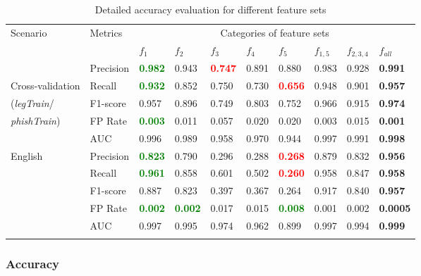 \documentclass[10pt,conference,compsocconf,letterpaper]{IEEEtran}
\begin{document}
\iffeateval
\begin{table*}[th]
\caption{Detailed accuracy evaluation for different feature sets} \centering
	\begin{tabular}{ p{2.3cm} p{2.2cm}  p{1.1cm}  p{1.1cm}  p{1.1cm} p{1.1cm}   p{1.1cm}   p{1.1cm}   p{1.1cm}   p{1.1cm}   }
	Scenario	& Metrics & \multicolumn{8}{c}{Categories of feature sets} \\
 &  &   $f_1$ & $f_2$ & $f_3$  & $f_4$ & $f_5$ & $f_{1,5}$  & $f_{2,3,4}$ &\textbf{$f_{all}$}  \\
		\hline
 &	Precision & \textbf{\textcolor{green}{0.982}} & 0.943 &  \textbf{\textcolor{red}{0.747}} &  0.891 &  0.880 &  0.983 &  0.928 &\textbf{0.991} 	 \\
Cross-validation & Recall & \textbf{\textcolor{green}{0.932}} & 0.852 & 0.750 & 0.730 & \textbf{\textcolor{red}{0.656}} & 0.948 & 0.901 &\textbf{0.957} 	 \\
(\textit{legTrain}/& F1-score & 0.957 & 0.896 & 0.749 & 0.803 & 0.752 & 0.966 & 0.915 & \textbf{0.974}	 \\
\textit{phishTrain})& FP Rate & \textbf{\textcolor{green}{0.003}} & 0.011 & 0.057 & 0.020 & 0.020 & 0.003 & 0.015 & \textbf{0.001}	 \\ 
& AUC & 0.996 & 0.989 & 0.958 & 0.970 & 0.944 & 0.997 & 0.991 & \textbf{0.998}	 \\ \hline
	\multirow{5}{*}{English} &Precision & \textbf{\textcolor{green}{0.823}} & 0.790 & 0.296 & 0.288 & \textbf{\textcolor{red}{0.268}} & 0.879 & 0.832 &\textbf{0.956} 	 \\
& Recall &\textbf{\textcolor{green}{0.961}} & 0.858 & 0.601 & 0.502 & \textbf{\textcolor{red}{0.260}} & 0.958 & 0.847 & \textbf{0.958}	 \\
& F1-score & 0.887 & 0.823 & 0.397 & 0.367 & 0.264 & 0.917 & 0.840 & \textbf{0.957}	 \\
& FP Rate &  \textbf{\textcolor{green}{0.002}} &  \textbf{\textcolor{green}{0.002}} & 0.017 & 0.015 & \textbf{\textcolor{green}{0.008}} & 0.001 & 0.002 & \textbf{0.0005} \\ 
& AUC & 0.997 & 0.995 & 0.974 & 0.962 & 0.899 & 0.997 & 0.994 & \textbf{0.999}	 \\ 
		\label{main-eval-table}
 \end{tabular}
\end{table*}
\fi

\iffeateval
\subsubsection{Accuracy}
\end{document}
